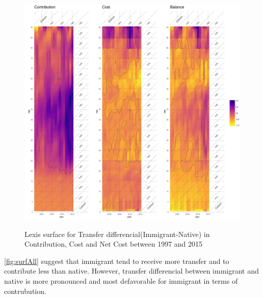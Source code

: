 \begin{figure}[H]%
  \caption{Lexis surface for Transfer differencial(Immigrant-Native) in Contribution, Cost and Net Cost between 1997 and 2015}
  \includegraphics[width=1\textwidth]{./res/surfAll.pdf}%
  \label{fig:surfAll}%
\end{figure}%



  \autoref{fig:surfAll} suggest that immigrant tend to receive more transfer and to contribute less than native. However, transfer differencial between immigrant and native is more pronounced and most defavorable for immigrant in terms of contrubution.